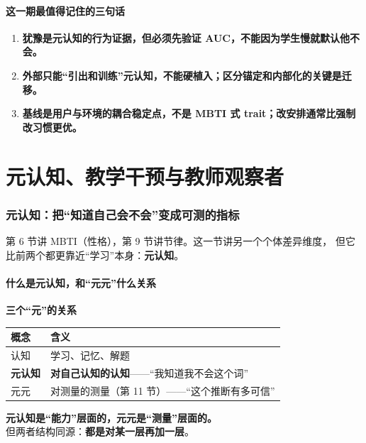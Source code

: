 \documentclass[UTF8,a4paper,11pt]{ctexart}
\newenvironment{explainbox}[1]
{\begin{center}\begin{minipage}{0.94\textwidth}\colorbox{boxbg}{\parbox{0.92\textwidth}{\textbf{#1}\par\vspace{2pt}}}}
{\end{minipage}\end{center}}
\begin{document}
\subsection{这一期最值得记住的三句话}

\begin{enumerate}[leftmargin=2em]
\item \textbf{犹豫是元认知的行为证据，但必须先验证 AUC，不能因为学生慢就默认他不会。}
\item \textbf{外部只能“引出和训练”元认知，不能硬植入；区分锚定和内部化的关键是迁移。}
\item \textbf{基线是用户与环境的耦合稳定点，不是 MBTI 式 trait；改安排通常比强制改习惯更优。}
\end{enumerate}

\newpage



\part{元认知、教学干预与教师观察者}

\section{元认知：把“知道自己会不会”变成可测的指标}

第 6 节讲 MBTI（性格），第 9 节讲节律。这一节讲另一个个体差异维度，
但它比前两个都更靠近“学习”本身：\textbf{元认知}。

\subsection{什么是元认知，和“元元”什么关系}

\begin{explainbox}{三个“元”的关系}
\begin{center}
\begin{tabular}{p{3.2cm}p{10.6cm}}
\toprule
\textbf{概念} & \textbf{含义} \\
\midrule
认知 & 学习、记忆、解题 \\
\textbf{元认知} & \textbf{对自己认知的认知}——“我知道我不会这个词” \\
元元 & 对测量的测量（第 11 节）——“这个推断有多可信” \\
\bottomrule
\end{tabular}
\end{center}
\textbf{元认知是“能力”层面的，元元是“测量”层面的。}\\
但两者结构同源：\textbf{都是对某一层再加一层}。
\end{explainbox}
\end{document}
